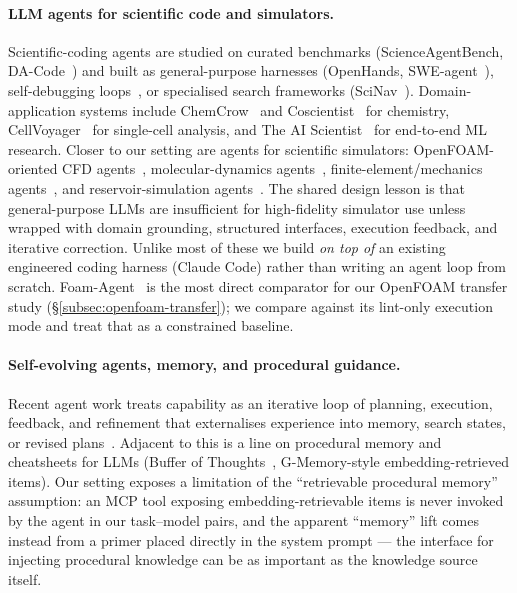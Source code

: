 \documentclass{article}
\begin{document}
\paragraph{LLM agents for scientific code and simulators.}
Scientific-coding agents are studied on curated benchmarks (ScienceAgentBench, DA-Code~\cite{chen2025scienceagentbench,huang2024dacode}) and built as general-purpose harnesses (OpenHands, SWE-agent~\cite{wang2024openhands,yang2024sweagent}), self-debugging loops~\cite{chen2024selfdebug}, or specialised search frameworks (SciNav~\cite{zhang2026scinav}). Domain-application systems include ChemCrow~\cite{bran2024chemcrow} and Coscientist~\cite{boiko2023coscientist} for chemistry, CellVoyager~\cite{alber2025cellvoyager} for single-cell analysis, and The AI Scientist~\cite{lu2024aiscientist,yamada2025ai} for end-to-end ML research. Closer to our setting are agents for scientific simulators: OpenFOAM-oriented CFD agents~\cite{chen2024metaopenfoam,pandey2025openfoamgpt,foamagent2025}, molecular-dynamics agents~\cite{kim2024mdagents,shi2026mdagent2,guilbert2025dynamate,zhao2026polyjarvis}, finite-element/mechanics agents~\cite{zhan2025mooseagent,ni2024mechagents}, and reservoir-simulation agents~\cite{moyner2026jutulgpt}. The shared design lesson is that general-purpose LLMs are insufficient for high-fidelity simulator use unless wrapped with domain grounding, structured interfaces, execution feedback, and iterative correction. Unlike most of these we build \emph{on top of} an existing engineered coding harness (Claude Code) rather than writing an agent loop from scratch. Foam-Agent~\cite{foamagent2025} is the most direct comparator for our OpenFOAM transfer study (\S\ref{subsec:openfoam-transfer}); we compare against its lint-only execution mode and treat that as a constrained baseline.

\paragraph{Self-evolving agents, memory, and procedural guidance.}
Recent agent work treats capability as an iterative loop of planning, execution, feedback, and refinement that externalises experience into memory, search states, or revised plans~\citep{bran2024chemcrow,boiko2023coscientist,alber2025cellvoyager,lu2024aiscientist,zhang2026scinav,li2026agentflow,tang2026eigenagent,narayanan2024aviary}. Adjacent to this is a line on procedural memory and cheatsheets for LLMs (Buffer of Thoughts~\cite{yang2024bot}, G-Memory-style embedding-retrieved items). Our setting exposes a limitation of the ``retrievable procedural memory'' assumption: an MCP tool exposing embedding-retrievable items is never invoked by the agent in our task--model pairs, and the apparent ``memory'' lift comes instead from a primer placed directly in the system prompt --- the interface for injecting procedural knowledge can be as important as the knowledge source itself.
\end{document}
